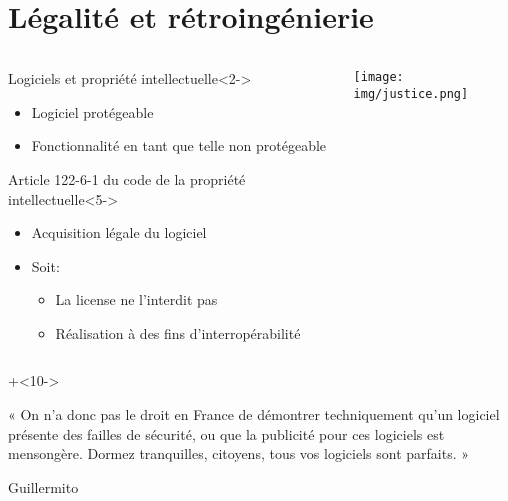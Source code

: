 \documentclass[aspectratio=1610]{beamer}%
\begin{document}
  \section{Légalité et rétroingénierie}
  \begin{frame}[t]
    \slidetitle[]%
    \begin{columns}
      \begin{column}{0.7\linewidth}
        \begin{block}{Logiciels et propriété intellectuelle}<2->
          \begin{itemize}
          \item<3-> Logiciel protégeable
          \item<4-> Fonctionnalité en tant que telle non protégeable
          \end{itemize}
        \end{block}
        \begin{block}{Article 122-6-1 du code de la propriété intellectuelle}<5->
          \begin{itemize}
          \item<6-> Acquisition légale du logiciel
          \item<7-> Soit:
          \begin{itemize}
          \item<8-> La license ne l'interdit pas
          \item<9-> Réalisation à des fins d'interropérabilité
          \end{itemize} 
          \end{itemize}
        \end{block}
      \end{column}
      \begin{column}{0.25\linewidth}
        \texttt{[image: img/justice.png]}
      \end{column}
    \end{columns}
      \onslide+<10->{\begin{center}
        « On n'a donc pas le droit en France de démontrer techniquement qu'un logiciel présente des failles
  de sécurité, ou que la publicité pour ces logiciels est mensongère. Dormez tranquilles, citoyens, tous
  vos logiciels sont parfaits. » 
      \end{center}
      \vspace{-1.5\baselineskip}
      \hspace{0.66\linewidth}Guillermito
      }
    \end{frame}
\end{document}
